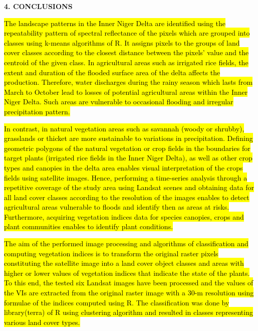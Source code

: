 \documentclass[12pt,a4paper,oneside]{article}
\def \newsection{\vspace{12pt}\textbf}
\def \newpar{\vspace{6pt}}
\begin{document}
\newsection {4. CONCLUSIONS}

\newpar \hl{The landscape patterns in the Inner Niger Delta are identified using the repeatability pattern of spectral reflectance of the pixels which are grouped into classes using k-means algorithms of R. It assigns pixels to the groups of land cover classes according to the closest distance between the pixels' value and the centroid of the given class. In agricultural areas such as irrigated rice fields, the extent and duration of the flooded surface area of the delta affects the production. Therefore, water discharges during the rainy season which lasts from March to October lead to losses of potential agricultural areas within the Inner Niger Delta. Such areas are vulnerable to occasional flooding and irregular precipitation pattern.}

\newpar \hl{In contrast, in natural vegetation areas such as savannah (woody or shrubby), grasslands or thicket are more sustainable to variations in precipitation. Defining geometric polygons of the natural vegetation or crop fields in the boundaries for target plants (irrigated rice fields in the Inner Niger Delta), as well as other crop types and canopies in the delta area enables visual interpretation of the crops fields using satellite images. Hence, performing a time-series analysis through a repetitive coverage of the study area using Landsat scenes and obtaining data for all land cover classes according to the resolution of the images enables to detect agricultural areas vulnerable to floods and identify then as areas at risks. Furthermore, acquiring vegetation indices data for species canopies, crops and plant communities enables to identify plant conditions. }

\newpar \hl{The aim of the performed image processing and algorithms of classification and computing vegetation indices is to transform the original raster pixels constituting the satellite image into a land cover object classes and areas with higher or lower values of vegetation indices that indicate the state of the plants. To this end, the tested six Landsat images have been processed and the values of the VIs are extracted from the original raster image with a 30-m resolution using formulae of the indices computed using R. The classification was done by library(terra) of R using clustering algorithm and resulted in classes representing various land cover types.} 
\end{document}

